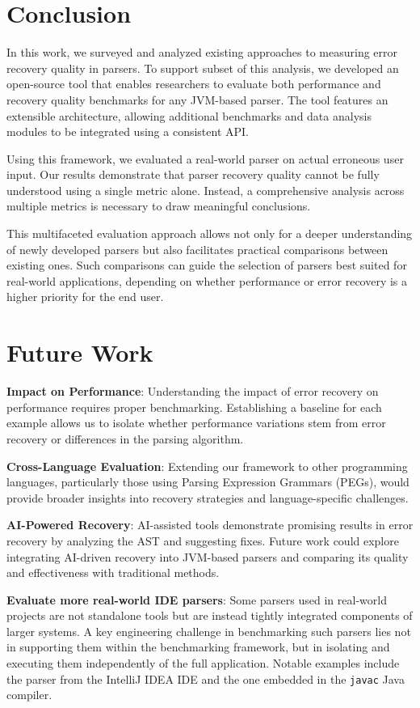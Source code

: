 \documentclass[conference]{IEEEtran}
\begin{document}
\section*{Conclusion}

In this work, we surveyed and analyzed existing approaches to measuring error recovery quality in parsers. To support subset of this analysis, we developed an open-source tool that enables researchers to evaluate both performance and recovery quality benchmarks for any JVM-based parser. The tool features an extensible architecture, allowing additional benchmarks and data analysis modules to be integrated using a consistent API.\@

Using this framework, we evaluated a real-world parser on actual erroneous user input. Our results demonstrate that parser recovery quality cannot be fully understood using a single metric alone. Instead, a comprehensive analysis across multiple metrics is necessary to draw meaningful conclusions.

This multifaceted evaluation approach allows not only for a deeper understanding of newly developed parsers but also facilitates practical comparisons between existing ones. Such comparisons can guide the selection of parsers best suited for real-world applications, depending on whether performance or error recovery is a higher priority for the end user.

\section{Future Work}

\textbf{Impact on Performance}: Understanding the impact of error recovery on performance requires proper benchmarking. Establishing a baseline for each example allows us to isolate whether performance variations stem from error recovery or differences in the parsing algorithm.

\textbf{Cross-Language Evaluation}: Extending our framework to other programming languages, particularly those using Parsing Expression Grammars (PEGs)\cite{peg-recovery, towards-recovery}, would provide broader insights into recovery strategies and language-specific challenges.

\textbf{AI-Powered Recovery}: AI-assisted tools demonstrate promising results in error recovery by analyzing the AST and suggesting fixes\cite{ai_recovery, seq2parse, ai-c-recovery}. Future work could explore integrating AI-driven recovery into JVM-based parsers and comparing its quality and effectiveness with traditional methods.

\textbf{Evaluate more real-world IDE parsers}: Some parsers used in real-world projects are not standalone tools but are instead tightly integrated components of larger systems. A key engineering challenge in benchmarking such parsers lies not in supporting them within the benchmarking framework, but in isolating and executing them independently of the full application. Notable examples include the parser from the IntelliJ IDEA IDE and the one embedded in the \texttt{javac} Java compiler.





\end{document}
